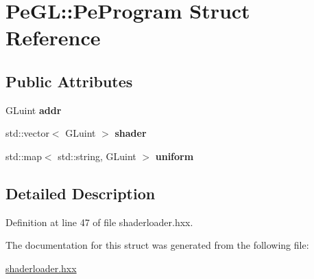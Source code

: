 \hypertarget{structPeGL_1_1PeProgram}{\section{Pe\-G\-L\-:\-:Pe\-Program Struct Reference}
\label{structPeGL_1_1PeProgram}
}
\subsection*{Public Attributes}
\begin{DoxyCompactItemize}
\item 
\hypertarget{structPeGL_1_1PeProgram_a686c8cfcec2d0f85c0a489ca2b03a558}{G\-Luint {\bfseries addr}}\label{structPeGL_1_1PeProgram_a686c8cfcec2d0f85c0a489ca2b03a558}

\item 
\hypertarget{structPeGL_1_1PeProgram_ab2da499cfe130d6dc4f2112ee3030b36}{std\-::vector$<$ G\-Luint $>$ {\bfseries shader}}\label{structPeGL_1_1PeProgram_ab2da499cfe130d6dc4f2112ee3030b36}

\item 
\hypertarget{structPeGL_1_1PeProgram_ac4d1d2053ba3785605056cabb166181e}{std\-::map$<$ std\-::string, G\-Luint $>$ {\bfseries uniform}}\label{structPeGL_1_1PeProgram_ac4d1d2053ba3785605056cabb166181e}

\end{DoxyCompactItemize}


\subsection{Detailed Description}


Definition at line 47 of file shaderloader.\-hxx.



The documentation for this struct was generated from the following file\-:\begin{DoxyCompactItemize}
\item 
\hyperlink{shaderloader_8hxx}{shaderloader.\-hxx}\end{DoxyCompactItemize}
